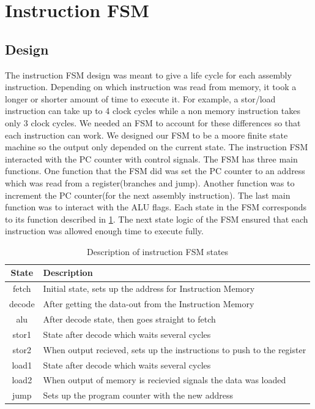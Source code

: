 \documentclass[11pt]{article}
\begin{document}
\section{Instruction FSM}
\subsection{Design}
The instruction FSM design was meant to give a life cycle for each assembly instruction. Depending on which instruction was read from memory, it took a longer or shorter amount of time to execute it. For example, a stor/load instruction can take up to 4 clock cycles while a non memory instruction takes only 3 clock cycles. We needed an FSM to account for these differences so that each instruction can work. We designed our FSM to be a moore finite state machine so the output only depended on the current state. The instruction FSM interacted with the PC counter with control signals.
The FSM has three main functions. One function that the FSM did was set the PC counter to an address which was read from a register(branches and jump). Another function was to increment the PC counter(for the next assembly instruction). The last main function was to interact with the ALU flags. Each state in the FSM corresponds to its function described in \ref{table:state}. The next state logic of the FSM ensured that each instruction was allowed enough time to execute fully.

\begin{table}
\centering
\caption{Description of instruction FSM states}
\begin{tabular}{|c|p{4in}|}
\hline
State & Description \\
\hline
fetch & Initial state, sets up the address for Instruction Memory \\
decode & After getting the data-out from the Instruction Memory \\
alu & After decode state, then goes straight to fetch \\
stor1 & State after decode which waits several cycles \\
stor2 & When output recieved, sets up the instructions to push to the register \\
load1 & State after decode which waits several cycles \\
load2 &  When output of memory is recievied signals the data was loaded \\
jump & Sets up the program counter with the new address \\
\hline
\end{tabular}
\label{table:state}
\end{table}
\end{document}
